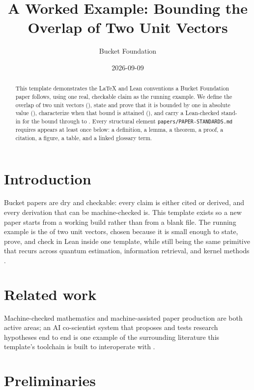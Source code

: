 \documentclass[11pt]{article}
\title{A Worked Example: Bounding the Overlap of Two Unit Vectors}
\author{Bucket Foundation}
\date{2026-09-09}
\begin{document}
\maketitle

\begin{abstract}
This template demonstrates the LaTeX and Lean conventions a Bucket
Foundation paper follows, using one real, checkable claim as the running
example. We define the overlap of two unit vectors (),
state and prove that it is bounded by one in absolute value
(), characterize when that bound is attained
(), and carry a Lean-checked stand-in for the bound
through to . Every structural element
\texttt{papers/PAPER-STANDARDS.md} requires appears at least once below:
a definition, a lemma, a theorem, a proof, a citation, a figure, a
table, and a linked glossary term.
\end{abstract}

\section{Introduction}
\label{sec:intro}

Bucket papers are dry and checkable: every claim is either cited or
derived, and every derivation that can be machine-checked is. This
template exists so a new paper starts from a working build rather than
from a blank file. The running example is the  of
two unit vectors, chosen because it is small enough to state, prove, and
check in Lean inside one template, while still being the same primitive
that recurs across quantum estimation, information retrieval, and kernel
methods \autocite{allen1983interval}.

\section{Related work}
\label{sec:related}

Machine-checked mathematics and machine-assisted paper production are
both active areas; an AI co-scientist system that proposes and tests
research hypotheses end to end is one example of the surrounding
literature this template's toolchain is built to interoperate with
\autocite{gottweis2025coscientist}.

\section{Preliminaries}
\label{sec:prelim}
\end{document}
